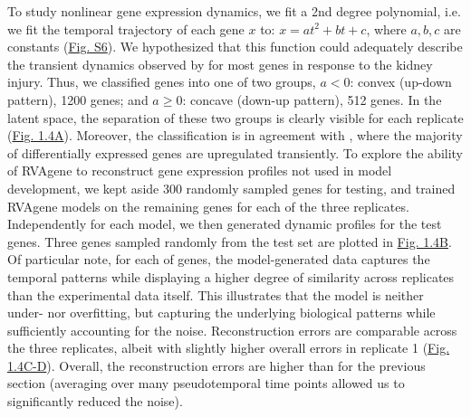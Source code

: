 \par
To study nonlinear gene expression dynamics, we fit a 2nd degree polynomial, i.e. we fit the temporal trajectory of each gene $x$ to:  $x = at^2 + bt + c$, where $a,b,c$ are constants (\hyperref[supp]{Fig. S6}). We hypothesized that this function could adequately describe the transient dynamics observed by \citet{liu2017molecular} for most genes in response to the kidney injury. 
Thus, we classified genes into one of two groups, $a < 0$: convex (up-down pattern), 1200 genes; and
$a \geq 0$: concave (down-up pattern), 512 genes. In the latent space, the separation of these two
groups is clearly visible for each replicate (\hyperref[fig:fig6a]{Fig. 1.4A}). Moreover, the classification is in agreement with \citet{liu2017molecular}, where the majority of differentially expressed genes are upregulated transiently. 
To explore the ability of RVAgene to reconstruct gene expression profiles not used in model
development, we kept aside 300 randomly sampled genes for testing, and trained RVAgene models on the
remaining genes for each of the three replicates. Independently for each model, we then generated
dynamic profiles for the test genes. Three genes sampled randomly from the test set are plotted in
\hyperref[fig:fig6a]{Fig. 1.4B}. Of particular note, for each of genes, the model-generated data captures the temporal patterns while displaying a higher degree of similarity across replicates than the experimental data itself. This illustrates that the model is neither under- nor overfitting, but capturing the underlying biological patterns while sufficiently accounting for the noise. 
Reconstruction errors are comparable across the three replicates, albeit with slightly higher
overall errors in replicate 1 (\hyperref[fig:fig6a]{Fig. 1.4C-D}). Overall, the reconstruction errors are higher than for the previous section (averaging over many pseudotemporal time points allowed us to significantly reduced the noise). 



